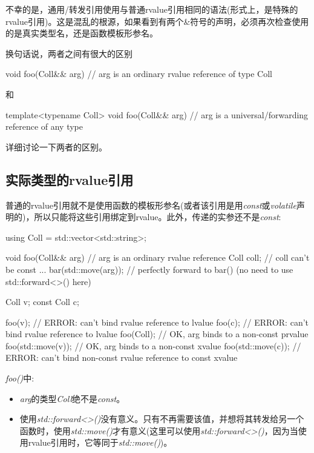 不幸的是，通用/转发引用使用与普通rvalue引用相同的语法(形式上，是特殊的rvalue引用)。这是混乱的根源，如果看到有两个\&符号的声明，必须再次检查使用的是真实类型名，还是函数模板形参名。

换句话说，两者之间有很大的区别

\begin{cppcode}
void foo(Coll&& arg) // arg is an ordinary rvalue reference of type Coll
\end{cppcode}

和

\begin{cppcode}
template<typename Coll>
void foo(Coll&& arg) // arg is a universal/forwarding reference of any type
\end{cppcode}

详细讨论一下两者的区别。

\subsection{实际类型的rvalue引用}

普通的rvalue引用就不是使用函数的模板形参名(或者该引用是用\textit{const}或\textit{volatile}声明的)，所以只能将这些引用绑定到rvalue。此外，传递的实参还不是\textit{const}:

\begin{cppcode}
using Coll = std::vector<std::string>;

void foo(Coll&& arg) // arg is an ordinary rvalue reference
{
	Coll coll; // coll can’t be const
	...
	bar(std::move(arg)); // perfectly forward to bar() (no need to use std::forward<>() here)
}

Coll v;
const Coll c;

foo(v); // ERROR: can’t bind rvalue reference to lvalue
foo(c); // ERROR: can’t bind rvalue reference to lvalue
foo(Coll{}); // OK, arg binds to a non-const prvalue
foo(std::move(v)); // OK, arg binds to a non-const xvalue
foo(std::move(c)); // ERROR: can’t bind non-const rvalue reference to const xvalue
\end{cppcode}

\textit{foo()}中:

\begin{itemize}
	\item \textit{arg}的类型\textit{Coll}绝不是\textit{const}。
	\item 使用\textit{std::forward<>()}没有意义。只有不再需要该值，并想将其转发给另一个函数时，使用\textit{std::move()}才有意义(这里可以使用\textit{std::forward<>()}，因为当使用rvalue引用时，它等同于\textit{std::move()})。
\end{itemize}

